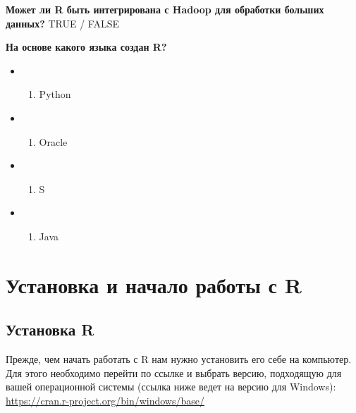 \documentclass[
  letterpaper,
  DIV=11,
  numbers=noendperiod]{scrreprt}
\providecommand{\tightlist}{%
  \setlength{\itemsep}{0pt}\setlength{\parskip}{0pt}}\usepackage{longtable,booktabs,array}
\begin{document}
\textbf{Может ли R быть интегрирована с Hadoop для обработки больших
данных?} TRUE / FALSE

\textbf{На основе какого языка создан R?}

\begin{itemize}
\item
  \begin{enumerate}
  \def\labelenumi{(\Alph{enumi})}
  \tightlist
  \item
    Python\\
  \end{enumerate}
\item
  \begin{enumerate}
  \def\labelenumi{(\Alph{enumi})}
  \setcounter{enumi}{1}
  \tightlist
  \item
    Oracle\\
  \end{enumerate}
\item
  \begin{enumerate}
  \def\labelenumi{(\Alph{enumi})}
  \setcounter{enumi}{2}
  \tightlist
  \item
    S\\
  \end{enumerate}
\item
  \begin{enumerate}
  \def\labelenumi{(\Alph{enumi})}
  \setcounter{enumi}{3}
  \tightlist
  \item
    Java
  \end{enumerate}
\end{itemize}


\hypertarget{ux443ux441ux442ux430ux43dux43eux432ux43aux430-ux438-ux43dux430ux447ux430ux43bux43e-ux440ux430ux431ux43eux442ux44b-ux441-r}{%
\chapter{Установка и начало работы с
R}\label{ux443ux441ux442ux430ux43dux43eux432ux43aux430-ux438-ux43dux430ux447ux430ux43bux43e-ux440ux430ux431ux43eux442ux44b-ux441-r}}

\hypertarget{ux443ux441ux442ux430ux43dux43eux432ux43aux430-r}{%
\section{Установка
R}\label{ux443ux441ux442ux430ux43dux43eux432ux43aux430-r}}

Прежде, чем начать работать с R нам нужно установить его себе на
компьютер. Для этого необходимо перейти по ссылке и выбрать версию,
подходящую для вашей операционной системы (ссылка ниже ведет на версию
для Windows): \url{https://cran.r-project.org/bin/windows/base/}
\end{document}
